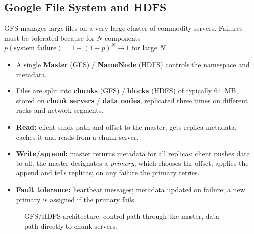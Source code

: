 \documentclass[11pt,a4paper,openany]{report}
\begin{document}
\subsection{Google File System and HDFS}
GFS manages large files on a very large cluster of commodity servers. Failures must be tolerated because for $N$
components $p(\text{system failure}) = 1 - (1 - p)^N \to 1$ for large $N$.
\begin{itemize}[leftmargin=*]
  \item A single \textbf{Master} (GFS) / \textbf{NameNode} (HDFS) controls the namespace and metadata.
  \item Files are split into \textbf{chunks} (GFS) / \textbf{blocks} (HDFS) of typically 64~MB, stored on \textbf{chunk servers} /
        \textbf{data nodes}, replicated three times on different racks and network segments.
  \item \textbf{Read:} client sends path and offset to the master, gets replica metadata, caches it and reads from a chunk
        server.
  \item \textbf{Write/append:} master returns metadata for all replicas; client pushes data to all; the master designates a
        \emph{primary}, which chooses the offset, applies the append and tells replicas; on any failure the primary retries.
  \item \textbf{Fault tolerance:} heartbeat messages; metadata updated on failure; a new primary is assigned if the primary fails.
\end{itemize}

\begin{figure}[H]
\centering
{}
\caption{GFS/HDFS architecture: control path through the master, data path directly to chunk servers.}
\end{figure}
\end{document}
